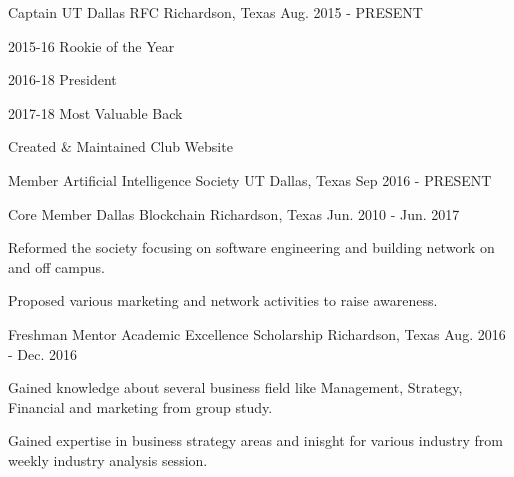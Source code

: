 

\begin{cventries}

  \cventry
    {Captain} %
    {UT Dallas RFC} %
    {Richardson, Texas} %
    {Aug. 2015 - PRESENT} %
    {
      \begin{cvitems} %
        \item {2015-16 Rookie of the Year}
        \item {2016-18 President}
        \item {2017-18 Most Valuable Back}
        \item {Created \& Maintained Club Website}
      \end{cvitems}
    }

  \cventry
    {Member} %
    {Artificial Intelligence Society} %
    {UT Dallas, Texas} %
    {Sep 2016 - PRESENT} %
    {
      \begin{cvitems} %
      \end{cvitems}
    }

  \cventry
    {Core Member} %
    {Dallas Blockchain} %
    {Richardson, Texas} %
    {Jun. 2010 - Jun. 2017} %
    {
      \begin{cvitems} %
        \item {Reformed the society focusing on software engineering and building network on and off campus.}
        \item {Proposed various marketing and network activities to raise awareness.}
      \end{cvitems}
    }

  \cventry
    {Freshman Mentor} %
    {Academic Excellence Scholarship} %
    {Richardson, Texas} %
    {Aug. 2016 - Dec. 2016} %
    {
      \begin{cvitems} %
        \item {Gained knowledge about several business field like Management, Strategy, Financial and marketing from group study.}
        \item {Gained expertise in business strategy areas and inisght for various industry from weekly industry analysis session.}
      \end{cvitems}
    }


\end{cventries}
